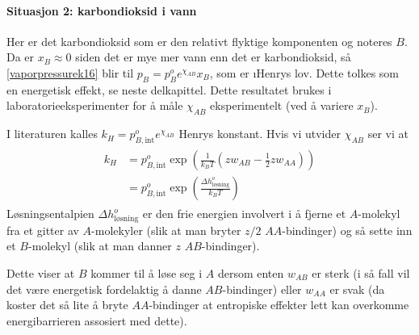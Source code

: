 \paragraph{Situasjon 2: karbondioksid i vann} Her er det karbondioksid som er den relativt flyktige komponenten og noteres $B$. Da er $x_B\approx0$ siden det er mye mer vann enn det er karbondioksid, så \eqref{vaporpressurek16} blir til $p_B=p_B^oe^{\chi_{AB}}x_B$, som er \i{Henrys lov}. Dette tolkes som en energetisk effekt, se neste delkapittel. Dette resultatet brukes i laboratorieeksperimenter for å måle $\chi_{AB}$ eksperimentelt (ved å variere $x_B$).

I literaturen kalles $k_H=p_{B,\text{int}}^oe^{\chi_{AB}}$ Henrys konstant. Hvis vi utvider $\chi_{AB}$ ser vi at
\begin{align}
\begin{split}
	k_H&=p_{B,\text{int}}^o\exp\left(\frac{1}{k_BT}\left(zw_{AB}-\frac{1}{2}zw_{AA}\right)\right) \\
	&=p_{B,\text{int}}^o\exp\left(\frac{\Delta h_{\text{løsning}}^o}{k_BT}\right)
\end{split}
\end{align}
Løsningsentalpien $\Delta h_{\text{løsning}}^o$ er den frie energien involvert i å fjerne et $A$-molekyl fra et gitter av $A$-molekyler (slik at man bryter $z/2$ $AA$-bindinger) og så sette inn et $B$-molekyl (slik at man danner $z$ $AB$-bindinger).

Dette viser at $B$ kommer til å løse seg i $A$ dersom enten $w_{AB}$ er sterk (i så fall vil det være energetisk fordelaktig å danne $AB$-bindinger) eller $w_{AA}$ er svak (da koster det så lite å bryte $AA$-bindinger at entropiske effekter lett kan overkomme energibarrieren assosiert med dette).

